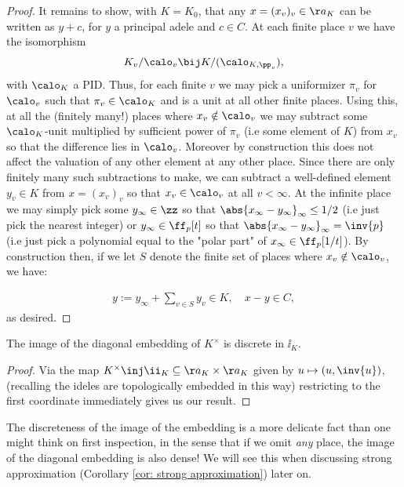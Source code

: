 \documentclass[11pt, x11names, openany]{book}
\begin{document}
\begin{proof}
It remains to show, with $K = K_0$, that any $x = (x_v)_v \in \aa_K$ can be written as $y+c$, for $y$ a principal adele and $c \in C$. At each finite place $v$ we have the isomorphism
\begin{equation*}
    K_v /\calo_v \bij K/(\calo_{K, \pp_v}),
\end{equation*}
with $\calo_K$ a PID. Thus, for each finite $v$ we may pick a uniformizer $\pi_v$ for $\calo_v$ such that $\pi_v \in \calo_K$ and is a unit at all other finite places. Using this, at all the (finitely many!) places where $x_v \notin \calo_v$ we may subtract some $\calo_K$-unit multiplied by sufficient power of $\pi_v$ (i.e some element of $K$) from $x_v$ so that the difference lies in $\calo_v$. Moreover by construction this does not affect the valuation of any other element at any other place. Since there are only finitely many such subtractions to make, we can subtract a well-defined element $y_v \in K$ from $x = (x_v)_v$ so that $x_v \in \calo_v$ at all $v < \infty$. At the infinite place we may simply pick some $y_\infty \in \zz$ so that $\abs{x_\infty - y_\infty}_\infty \leq 1/2$ (i.e just pick the nearest integer) or $y_\infty \in \ff_p[t]$ so that $ \abs{x_\infty - y_\infty}_\infty = \inv{p}$ (i.e just pick a polynomial equal to the "polar part" of $x_\infty \in \ff_p[1/t]$). By construction then, if we let $S$ denote the finite set of places where $x_v \notin \calo_v$, we have:

\begin{align*}
y := y_\infty + \sum_{v \in S}y_v \in K, \quad x - y \in C,
\end{align*}
as desired.
\end{proof}

\begin{corollary}
    \label{cor: K^times discrete in I_K}
    The image of the diagonal embedding of $K^\times$ is discrete in $\ii_K$. 
\end{corollary}
\begin{proof}
Via the map $K^\times \inj \ii_K \subseteq \aa_K \times \aa_K$ given by $u \mapsto (u, \inv{u})$, (recalling the ideles are topologically embedded in this way) restricting to the first coordinate immediately gives us our result. 
\end{proof}

\begin{remark}
The discreteness of the image of the embedding is a more delicate fact than one might think on first inspection, in the sense that if we omit \textit{any} place, the image of the diagonal embedding is also dense! We will see this when discussing strong approximation (Corollary \ref{cor: strong approximation}) later on.
\end{remark}
\end{document}
